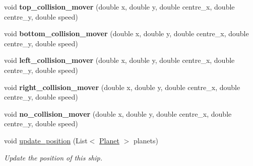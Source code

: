 \begin{DoxyCompactItemize}
\item 
\mbox{\label{classfr_1_1groupe40_1_1projet_1_1model_1_1ships_1_1_ship_aab898b49dfc4d08d3b8ac7b08d936697}} 
void {\bfseries top\+\_\+collision\+\_\+mover} (double x, double y, double centre\+\_\+x, double centre\+\_\+y, double speed)
\item 
\mbox{\label{classfr_1_1groupe40_1_1projet_1_1model_1_1ships_1_1_ship_a88644a9fdb0c146f6f9ba556326e7122}} 
void {\bfseries bottom\+\_\+collision\+\_\+mover} (double x, double y, double centre\+\_\+x, double centre\+\_\+y, double speed)
\item 
\mbox{\label{classfr_1_1groupe40_1_1projet_1_1model_1_1ships_1_1_ship_a2908d837a3d3515380ce728f42b43b52}} 
void {\bfseries left\+\_\+collision\+\_\+mover} (double x, double y, double centre\+\_\+x, double centre\+\_\+y, double speed)
\item 
\mbox{\label{classfr_1_1groupe40_1_1projet_1_1model_1_1ships_1_1_ship_a1e045760991d3d6594a41348128f6bef}} 
void {\bfseries right\+\_\+collision\+\_\+mover} (double x, double y, double centre\+\_\+x, double centre\+\_\+y, double speed)
\item 
\mbox{\label{classfr_1_1groupe40_1_1projet_1_1model_1_1ships_1_1_ship_af506b10fa38eae488d02c08fccb3d7df}} 
void {\bfseries no\+\_\+collision\+\_\+mover} (double x, double y, double centre\+\_\+x, double centre\+\_\+y, double speed)
\item 
void \mbox{\hyperlink{classfr_1_1groupe40_1_1projet_1_1model_1_1ships_1_1_ship_af4fcf4bf2b5fdad442d33491c69b2019}{update\+\_\+position}} (List$<$ \mbox{\hyperlink{classfr_1_1groupe40_1_1projet_1_1model_1_1planets_1_1_planet}{Planet}} $>$ planets)
\begin{DoxyCompactList}\small\item\em Update the position of this ship. \end{DoxyCompactList}\item 
\mbox{\label{classfr_1_1groupe40_1_1projet_1_1model_1_1ships_1_1_ship_a2d132d6ec4b6025f82cf687916bb7f95}} 

\end{DoxyCompactItemize}
